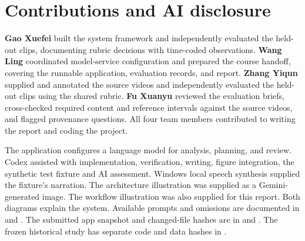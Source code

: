 \section{Contributions and AI disclosure}
\label{sec:disclosure}
\textbf{Gao Xuefei} built the system framework and independently evaluated the held-out clips, documenting rubric decisions with time-coded observations.
\textbf{Wang Ling} coordinated model-service configuration and prepared the course handoff, covering the runnable application, evaluation records, and report.
\textbf{Zhang Yiqun} supplied and annotated the source videos and independently evaluated the held-out clips using the shared rubric.
\textbf{Fu Xuanyu} reviewed the evaluation briefs, cross-checked required content and reference intervals against the source videos, and flagged provenance questions.
All four team members contributed to writing the report and coding the project.

The application configures a language model for analysis, planning, and review. Codex assisted with implementation, verification, writing, figure integration, the synthetic test fixture and AI assessment. Windows local speech synthesis supplied the fixture's narration. The architecture illustration was supplied as a Gemini-generated image. The workflow illustration was also supplied for this report. Both diagrams explain the system. Available prompts and omissions are documented in  and . The submitted app snapshot and changed-file hashes are in  and . The frozen historical study has separate code and data hashes in .


